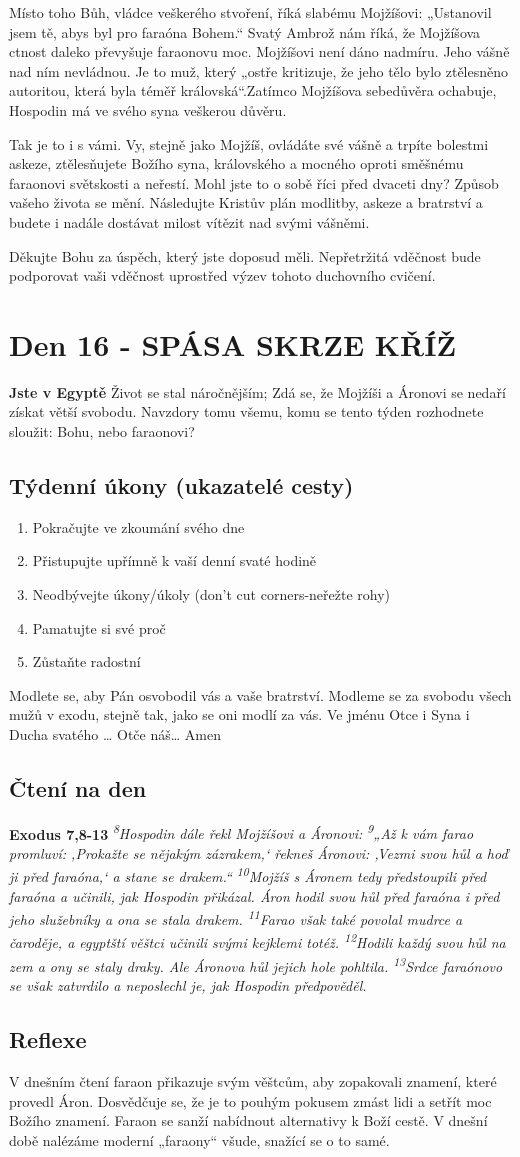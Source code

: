 \documentclass[11pt]{article}
\newcommand{\zacatekTretiTyden}{
  \textbf{Jste v Egyptě} \newline
  Život se stal náročnějším; Zdá se, že Mojžíši a Áronovi se nedaří získat větší svobodu. Navzdory tomu všemu,
komu se tento týden rozhodnete sloužit: Bohu, nebo faraonovi?

\subsection*{Týdenní úkony (ukazatelé cesty)}
\begin{enumerate}
  \item Pokračujte ve zkoumání svého dne
  \item Přistupujte upřímně k vaší denní svaté hodině
  \item Neodbývejte úkony/úkoly (don’t cut corners-neřežte rohy)
  \item Pamatujte si své proč
  \item Zůstaňte radostní
\end{enumerate}
Modlete se, aby Pán osvobodil vás a vaše bratrství. \newline
Modleme se za svobodu všech mužů v exodu, stejně tak, jako se oni modlí za vás.\newline
Ve jménu Otce i Syna i Ducha svatého …  Otče náš… Amen
}
\begin{document}
Místo toho Bůh, vládce veškerého stvoření, říká slabému Mojžíšovi: „Ustanovil jsem tě, abys byl pro faraóna
Bohem.“ Svatý Ambrož nám říká, že Mojžíšova ctnost daleko převyšuje faraonovu moc. Mojžíšovi není dáno
nadmíru. Jeho vášně nad ním nevládnou. Je to muž, který „ostře kritizuje, že jeho tělo bylo ztělesněno autoritou,
která byla téměř královská“.Zatímco Mojžíšova sebedůvěra ochabuje, Hospodin má ve svého syna veškerou
důvěru.

Tak je to i s vámi. Vy, stejně jako Mojžíš, ovládáte své vášně a trpíte bolestmi askeze, ztělesňujete Božího syna,
královského a mocného oproti směšnému faraonovi světskosti a neřestí. Mohl jste to o sobě říci před dvaceti dny?
Způsob vašeho života se mění. Následujte Kristův plán modlitby, askeze a bratrství a budete i nadále dostávat
milost vítězit nad svými vášněmi.

Děkujte Bohu za úspěch, který jste doposud měli. Nepřetržitá vděčnost bude podporovat vaši vděčnost uprostřed
výzev tohoto duchovního cvičení.

\newpage
\section{Den 16 - SPÁSA SKRZE KŘÍŽ}
\zacatekTretiTyden
\subsection*{Čtení na den}
\textbf{Exodus 7,8-13}
\newline
\textit{
\textsuperscript{8}Hospodin dále řekl Mojžíšovi a Áronovi:
\textsuperscript{9}„Až k vám farao promluví: ‚Prokažte se nějakým zázrakem,‘ řekneš Áronovi: ‚Vezmi svou hůl a hoď ji před faraóna,‘ a stane se drakem.“
\textsuperscript{10}Mojžíš s Áronem tedy předstoupili před faraóna a učinili, jak Hospodin přikázal. Áron hodil svou hůl před faraóna i před jeho služebníky a ona se stala drakem.
\textsuperscript{11}Farao však také povolal mudrce a čaroděje, a egyptští věštci učinili svými kejklemi totéž.
\textsuperscript{12}Hodili každý svou hůl na zem a ony se staly draky. Ale Áronova hůl jejich hole pohltila.
\textsuperscript{13}Srdce faraónovo se však zatvrdilo a neposlechl je, jak Hospodin předpověděl.
}

\subsection*{Reflexe}

V dnešním čtení faraon přikazuje svým věštcům, aby zopakovali znamení, které provedl Áron.
Dosvědčuje se, že je to pouhým pokusem zmást lidi a setřít moc Božího znamení. Faraon se sanží
nabídnout alternativy k Boží cestě. V dnešní době nalézáme moderní „faraony“ všude, snažící se o to
samé.
\end{document}
